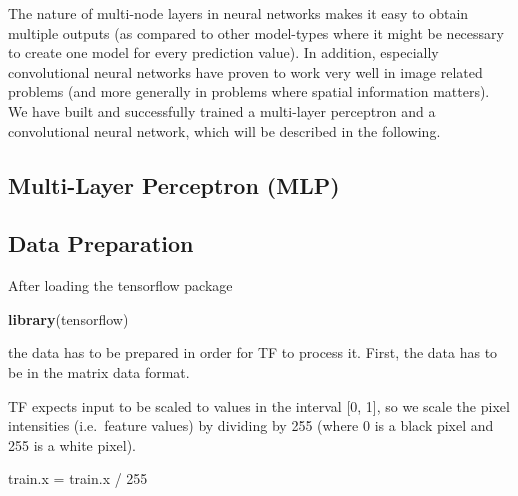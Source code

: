 \documentclass[]{article}
\newenvironment{Shaded}{\begin{snugshade}}{\end{snugshade}}
\newcommand{\KeywordTok}[1]{\textcolor[rgb]{0.13,0.29,0.53}{\textbf{{#1}}}}
\newcommand{\DecValTok}[1]{\textcolor[rgb]{0.00,0.00,0.81}{{#1}}}
\newcommand{\StringTok}[1]{\textcolor[rgb]{0.31,0.60,0.02}{{#1}}}
\newcommand{\NormalTok}[1]{{#1}}
\begin{document}
The nature of multi-node layers in neural networks makes it easy to
obtain multiple outputs (as compared to other model-types where it might
be necessary to create one model for every prediction value). In
addition, especially convolutional neural networks have proven to work
very well in image related problems (and more generally in problems
where spatial information matters). We have built and successfully
trained a multi-layer perceptron and a convolutional neural network,
which will be described in the following.

\subsection{Multi-Layer Perceptron
(MLP)}\label{multi-layer-perceptron-mlp}

\subsection{Data Preparation}\label{data-preparation}

After loading the tensorflow package

\begin{Shaded}
\begin{Highlighting}[]
\KeywordTok{library}\NormalTok{(tensorflow)}
\end{Highlighting}
\end{Shaded}

the data has to be prepared in order for TF to process it. First, the
data has to be in the matrix data format.

\begin{Shaded}
\end{Shaded}

TF expects input to be scaled to values in the interval {[}0, 1{]}, so
we scale the pixel intensities (i.e.~feature values) by dividing by 255
(where 0 is a black pixel and 255 is a white pixel).

\begin{Shaded}
\begin{Highlighting}[]
\NormalTok{train.x =}\StringTok{ }\NormalTok{train.x /}\StringTok{ }\DecValTok{255}
\end{Highlighting}
\end{Shaded}
\end{document}
